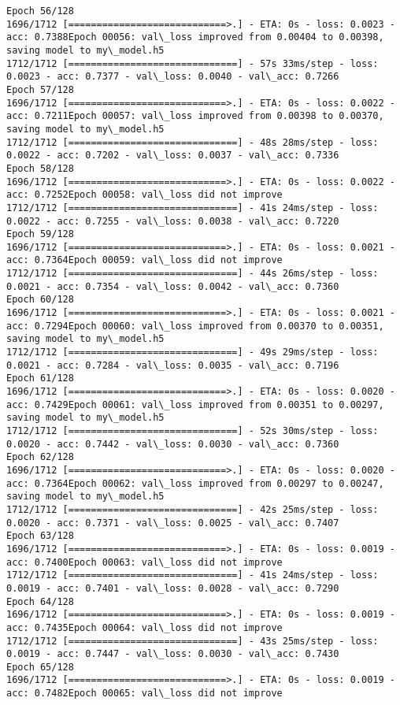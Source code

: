 \documentclass[11pt]{article}
\begin{document}
\begin{Verbatim}[commandchars=\\\{\}]
Epoch 56/128
1696/1712 [============================>.] - ETA: 0s - loss: 0.0023 - acc: 0.7388Epoch 00056: val\_loss improved from 0.00404 to 0.00398, saving model to my\_model.h5
1712/1712 [==============================] - 57s 33ms/step - loss: 0.0023 - acc: 0.7377 - val\_loss: 0.0040 - val\_acc: 0.7266
Epoch 57/128
1696/1712 [============================>.] - ETA: 0s - loss: 0.0022 - acc: 0.7211Epoch 00057: val\_loss improved from 0.00398 to 0.00370, saving model to my\_model.h5
1712/1712 [==============================] - 48s 28ms/step - loss: 0.0022 - acc: 0.7202 - val\_loss: 0.0037 - val\_acc: 0.7336
Epoch 58/128
1696/1712 [============================>.] - ETA: 0s - loss: 0.0022 - acc: 0.7252Epoch 00058: val\_loss did not improve
1712/1712 [==============================] - 41s 24ms/step - loss: 0.0022 - acc: 0.7255 - val\_loss: 0.0038 - val\_acc: 0.7220
Epoch 59/128
1696/1712 [============================>.] - ETA: 0s - loss: 0.0021 - acc: 0.7364Epoch 00059: val\_loss did not improve
1712/1712 [==============================] - 44s 26ms/step - loss: 0.0021 - acc: 0.7354 - val\_loss: 0.0042 - val\_acc: 0.7360
Epoch 60/128
1696/1712 [============================>.] - ETA: 0s - loss: 0.0021 - acc: 0.7294Epoch 00060: val\_loss improved from 0.00370 to 0.00351, saving model to my\_model.h5
1712/1712 [==============================] - 49s 29ms/step - loss: 0.0021 - acc: 0.7284 - val\_loss: 0.0035 - val\_acc: 0.7196
Epoch 61/128
1696/1712 [============================>.] - ETA: 0s - loss: 0.0020 - acc: 0.7429Epoch 00061: val\_loss improved from 0.00351 to 0.00297, saving model to my\_model.h5
1712/1712 [==============================] - 52s 30ms/step - loss: 0.0020 - acc: 0.7442 - val\_loss: 0.0030 - val\_acc: 0.7360
Epoch 62/128
1696/1712 [============================>.] - ETA: 0s - loss: 0.0020 - acc: 0.7364Epoch 00062: val\_loss improved from 0.00297 to 0.00247, saving model to my\_model.h5
1712/1712 [==============================] - 42s 25ms/step - loss: 0.0020 - acc: 0.7371 - val\_loss: 0.0025 - val\_acc: 0.7407
Epoch 63/128
1696/1712 [============================>.] - ETA: 0s - loss: 0.0019 - acc: 0.7400Epoch 00063: val\_loss did not improve
1712/1712 [==============================] - 41s 24ms/step - loss: 0.0019 - acc: 0.7401 - val\_loss: 0.0028 - val\_acc: 0.7290
Epoch 64/128
1696/1712 [============================>.] - ETA: 0s - loss: 0.0019 - acc: 0.7435Epoch 00064: val\_loss did not improve
1712/1712 [==============================] - 43s 25ms/step - loss: 0.0019 - acc: 0.7447 - val\_loss: 0.0030 - val\_acc: 0.7430
Epoch 65/128
1696/1712 [============================>.] - ETA: 0s - loss: 0.0019 - acc: 0.7482Epoch 00065: val\_loss did not improve

\end{Verbatim}
\end{document}
